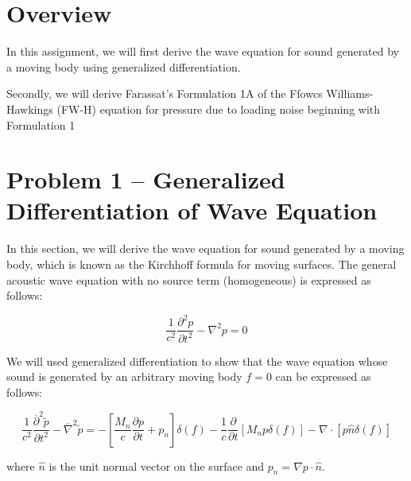 \documentclass[]{aiaa-tc}%
\begin{document}
\section*{Overview} %

In this assignment, we will first derive the wave equation for sound generated by a moving body using generalized differentiation.

Secondly, we will derive Farassat's Formulation 1A of the Ffowcs Williams-Hawkings (FW-H) equation for pressure due to loading noise beginning with Formulation 1






\section{Problem 1 -- Generalized Differentiation of Wave Equation} \label{SecGenDiff}

In this section, we will derive the wave equation for sound generated by a moving body, which is known as the Kirchhoff formula for moving surfaces.  The general acoustic wave equation with no source term (homogeneous) is expressed as follows:

\begin{equation} \label{AcousticWaveHomo}
\boxed{\dfrac{1}{c^2}\dfrac{\partial^2p}{\partial t^2} - \nabla^2p = 0}
\end{equation}

We will used generalized differentiation to show that the wave equation whose sound is generated by an arbitrary moving body $f=0$ can be expressed as follows:

\begin{equation} \label{AcousticWaveBody}
\boxed{\dfrac{1}{c^2}\dfrac{ \overline{\partial}^2\widetilde{p}}{\partial t^2}
    - \overline{\nabla}^2 \widetilde{p}
= -\left[ \dfrac{M_n}{c} \dfrac{\partial p}{\partial t} + p_n \right] \delta(f)
    -\dfrac{1}{c} \dfrac{\partial}{\partial t} \left[ M_n p \delta(f) \right]
    -\nabla \cdot \left[ p \hat{n} \delta(f) \right]}
\end{equation}

\noindent where $\hat{n}$ is the unit normal vector on the surface and $p_n = \nabla p \cdot \hat{n}$.
\end{document}
